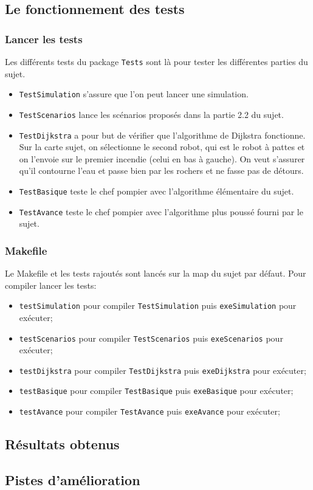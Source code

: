 \documentclass[a4paper,8pt]{article} %
\begin{document}
\subsection{Le fonctionnement des tests}
\subsubsection{Lancer les tests}
Les différents tests du package \texttt{Tests} sont là pour tester les différentes parties du sujet.
\begin{itemize}
    \item \texttt{TestSimulation} s'assure que l'on peut lancer une simulation.
    \item \texttt{TestScenarios} lance les scénarios proposés dans la partie 2.2 du sujet.
    \item \texttt{TestDijkstra} a pour but de vérifier que l'algorithme de Dijkstra fonctionne. Sur la carte sujet, 
    on sélectionne le second robot, qui est le robot à pattes et on l'envoie sur le premier incendie (celui en bas à gauche).
    On veut s'assurer qu'il contourne l'eau et passe bien par les rochers et ne fasse pas de détours.
    \item \texttt{TestBasique} teste le chef pompier avec l'algorithme élémentaire du sujet.
    \item \texttt{TestAvance} teste le chef pompier avec l'algorithme plus poussé fourni par le sujet.
\end{itemize}

\subsubsection{Makefile}
Le Makefile et les tests rajoutés sont lancés sur la map du sujet par défaut.
Pour compiler lancer les tests: 
\begin{itemize}
    \item \texttt{testSimulation} pour compiler \texttt{TestSimulation} puis \texttt{exeSimulation} pour exécuter;
    \item \texttt{testScenarios} pour compiler \texttt{TestScenarios} puis \texttt{exeScenarios} pour exécuter;
    \item \texttt{testDijkstra} pour compiler \texttt{TestDijkstra} puis \texttt{exeDijkstra} pour exécuter;
    \item \texttt{testBasique} pour compiler \texttt{TestBasique} puis \texttt{exeBasique} pour exécuter;
    \item \texttt{testAvance} pour compiler \texttt{TestAvance} puis \texttt{exeAvance} pour exécuter;
\end{itemize}


\subsection{Résultats obtenus}
\subsection{Pistes d'amélioration}
\end{document}
